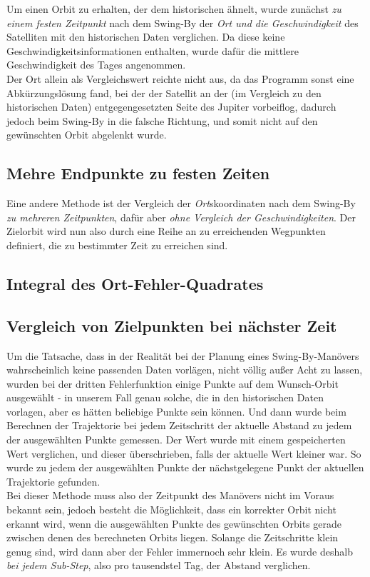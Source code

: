 Um einen Orbit zu erhalten, der dem historischen ähnelt, wurde zunächst \textit{zu einem festen Zeitpunkt} nach dem Swing-By der \textit{Ort und die Geschwindigkeit} des Satelliten mit den historischen Daten verglichen. Da diese keine Geschwindigkeitsinformationen enthalten, wurde dafür die mittlere Geschwindigkeit des Tages angenommen. \\
Der Ort allein als Vergleichswert reichte nicht aus, da das Programm sonst eine Abkürzungslösung fand, bei der der Satellit an der (im Vergleich zu den historischen Daten) entgegengesetzten Seite des Jupiter vorbeiflog, dadurch jedoch beim Swing-By in die falsche Richtung, und somit nicht auf den gewünschten Orbit abgelenkt wurde.

\subsection{Mehre Endpunkte zu festen Zeiten}

Eine andere Methode ist der Vergleich der \textit{Ort}skoordinaten nach dem Swing-By \textit{zu mehreren Zeitpunkten}, dafür aber \textit{ohne Vergleich der Geschwindigkeiten}. Der Zielorbit wird nun also durch eine Reihe an zu erreichenden Wegpunkten definiert, die zu bestimmter Zeit zu erreichen sind.

\subsection{Integral des Ort-Fehler-Quadrates}




\subsection{Vergleich von Zielpunkten bei nächster Zeit}

Um die Tatsache, dass in der Realität bei der Planung eines Swing-By-Manövers wahrscheinlich keine passenden Daten vorlägen, nicht völlig außer Acht zu lassen, wurden bei der dritten Fehlerfunktion einige Punkte auf dem Wunsch-Orbit ausgewählt - in unserem Fall genau solche, die in den historischen Daten vorlagen, aber es hätten beliebige Punkte sein können. Und dann wurde beim Berechnen der Trajektorie bei jedem Zeitschritt der aktuelle Abstand zu jedem der ausgewählten Punkte gemessen. Der Wert wurde mit einem gespeicherten Wert verglichen, und dieser überschrieben, falls der aktuelle Wert kleiner war. So wurde zu jedem der ausgewählten Punkte der nächstgelegene Punkt der aktuellen Trajektorie gefunden.\\
Bei dieser Methode muss also der Zeitpunkt des Manövers nicht im Voraus bekannt sein, jedoch besteht die Möglichkeit, dass ein korrekter Orbit nicht erkannt wird, wenn die ausgewählten Punkte des gewünschten Orbits gerade zwischen denen des berechneten Orbits liegen. Solange die Zeitschritte klein genug sind, wird dann aber der Fehler immernoch sehr klein. Es wurde deshalb \textit{bei jedem Sub-Step}, also pro tausendstel Tag, der Abstand verglichen.






